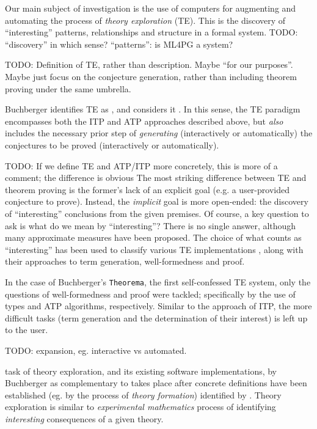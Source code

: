 \documentclass[]{article}
\begin{document}
Our main subject of investigation is the use of computers for augmenting and automating the process of \emph{theory exploration} (TE). This is the discovery of ``interesting'' patterns, relationships and structure in a formal system. TODO: ``discovery'' in which sense? ``patterns'': is ML4PG a system?

TODO: Definition of TE, rather than description. Maybe ``for our purposes''. Maybe just focus on the conjecture generation, rather than including theorem proving under the same umbrella.

Buchberger identifies TE as  \cite{buchberger2004algorithm}, and considers it  \cite{buchberger2000theory}. In this sense, the TE paradigm encompasses both the ITP and ATP approaches described above, but \emph{also} includes the necessary prior step of \emph{generating} (interactively or automatically) the conjectures to be proved (interactively or automatically).

TODO: If we define TE and ATP/ITP more concretely, this is more of a comment; the difference is obvious
The most striking difference between TE and theorem proving is the former's lack of an explicit goal (e.g. a user-provided conjecture to prove). Instead, the \emph{implicit} goal is more open-ended: the discovery of ``interesting'' conclusions from the given premises. Of course, a key question to ask is what do we mean by ``interesting''? There is no single answer, although many approximate measures have been proposed. The choice of what counts as ``interesting'' has been used to classify various TE implementations \cite{warburtonscaling}, along with their approaches to term generation, well-formedness and proof.

In the case of Buchberger's \texttt{Theorema}, the first self-confessed TE system, only the questions of well-formedness and proof were tackled; specifically by the use of types and ATP algorithms, respectively. Similar to the approach of ITP, the more difficult tasks (term generation and the determination of their interest) is left up to the user.

TODO: expansion, eg. interactive vs automated.

  task of theory exploration, and its existing software implementations, by Buchberger as complementary to  takes place after concrete definitions have been established (eg. by the process of \emph{theory formation})  identified by . Theory exploration is similar to \emph{experimental mathematics} process of identifying \emph{interesting} consequences of a given theory.
\end{document}
